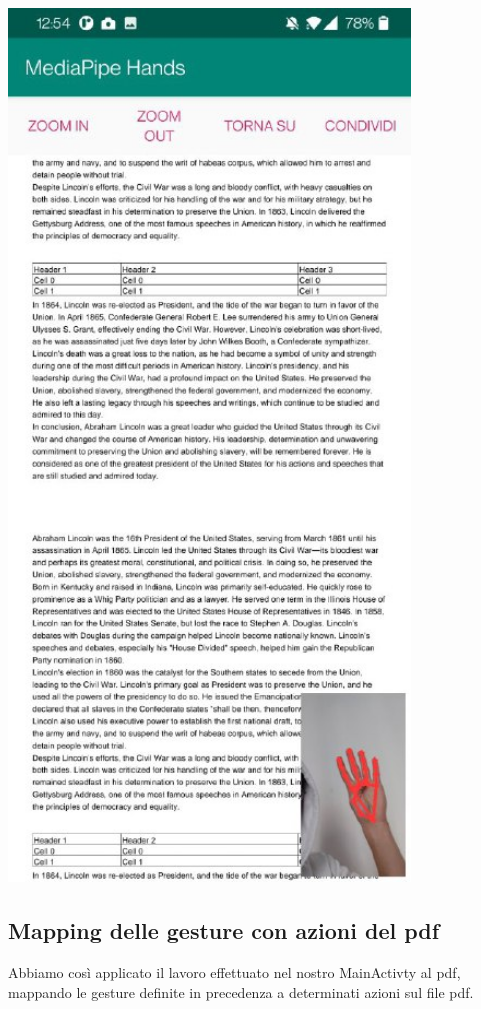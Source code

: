\begin{multicols}{2}
\begin{multicolfigure}
            \includegraphics[width=0.8\textwidth]{images/pdfactivity.png}
        \end{multicolfigure}
    \end{multicols}


\newpage
\subsection{Mapping delle gesture con azioni del pdf}
Abbiamo così applicato il lavoro effettuato nel nostro MainActivty al pdf, mappando le gesture definite in precedenza a determinati azioni sul file pdf.

